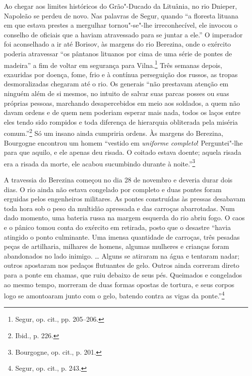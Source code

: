 Ao chegar aos limites históricos do Grão"-Ducado da Lituânia, no rio
Dnieper, Napoleão se perdeu de novo. Nas palavras de Segur, quando ``a
floresta lituana em que estava prestes a mergulhar tornou"-se"-lhe
irreconhecível, ele invocou o conselho de oficiais que a haviam
atravessado para se juntar a ele.'' O imperador foi aconselhado a ir até
Borisov, às margens do rio Berezina, onde o exército poderia atravessar
``os pântanos lituanos por cima de uma série de pontes de madeira'' a
fim de voltar em segurança para Vilna.\footnote{Segur, op. cit., pp. 205--206.} Três semanas depois, exauridas por doença, fome, frio e à contínua perseguição dos russos, as tropas desmoralizadas chegaram até o
rio. Os generais ``não prestavam atenção em ninguém além de si mesmos,
no intuito de salvar suas parcas posses ou suas próprias pessoas,
marchando desapercebidos em meio aos soldados, a quem não davam ordens e
de quem nem poderiam esperar mais nada, todos os laços entre eles tendo
sido rompidos e toda diferença de hierarquia obliterada pela miséria
comum.''\footnote{Ibid., p. 226.} Só um insano ainda cumpriria ordens.
Às margens do Berezina, Bourgogne encontrou um homem ``vestido em
\textit{uniforme completo}! Perguntei"-lhe para que aquilo, e ele apenas
deu risada. O coitado estava doente; aquela risada era a risada da
morte, ele acabou sucumbindo durante à noite.''\footnote{Bourgogne, op. cit., p. 201.}

A travessia do Berezina começou no dia 28 de novembro e deveria durar
dois dias. O rio ainda não estava congelado por completo e duas pontes
foram erguidas pelos engenheiros militares. As pontes construídas às
pressas desabavam toda hora sob o peso da multidão apressada e das
carroças abarrotadas. Num dado momento, uma bateria russa na margem
esquerda do rio abriu fogo. O caos e o pânico tomou conta do exército em
retirada, posto que o desastre ``havia atingido o ponto culminante. Uma
imensa quantidade de carroças, três pesadas peças de artilharia,
milhares de homens, algumas mulheres e crianças foram abandonados no
lado inimigo. \ldots{} Alguns se atiraram na água e tentaram nadar;
outros apostaram nos pedaços flutuantes de gelo. Outros ainda correram
direto para a ponte em chamas, que ruiu debaixo de seus pés. Queimados e
congelados ao mesmo tempo, morreram de duas formas opostas de tortura, e
seus corpos logo se amontoaram junto com o gelo, batendo contra as vigas
da ponte.''\footnote{Segur, op. cit., p. 243.}

